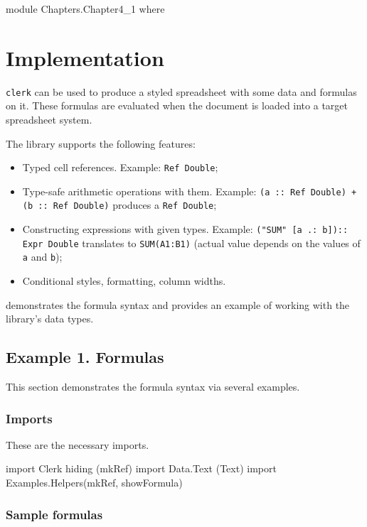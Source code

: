 
module Chapters.Chapter4_1 where


\chapter{Implementation}
\label{chap:impl}

\texttt{clerk} can be used to produce a styled spreadsheet with some data and formulas on it. These formulas are evaluated when the document is loaded into a target spreadsheet system.

The library supports the following features:

\begin{itemize}
  \item Typed cell references. Example: \texttt{Ref Double};
  \item Type-safe arithmetic operations with them. Example: \texttt{(a :: Ref Double) + (b :: Ref Double)} produces a \texttt{Ref Double};
  \item Constructing expressions with given types. Example: \texttt{("SUM" [a .: b]):: Expr Double} translates to \texttt{SUM(A1:B1)} (actual value depends on the values of \texttt{a} and \texttt{b});
  \item Conditional styles, formatting, column widths.
\end{itemize}

 demonstrates the formula syntax and  provides an example of working with the library's data types.

\section{Example 1. Formulas}
\label{sec:ex1}

This section demonstrates the formula syntax via several examples.

\subsection{Imports}

These are the necessary imports.

\begin{mycode}
import Clerk hiding (mkRef)
import Data.Text (Text)
import Examples.Helpers(mkRef, showFormula)
\end{mycode}

\subsection{Sample formulas}

